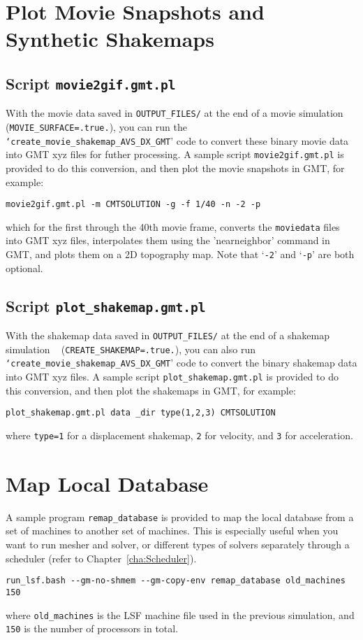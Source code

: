 \section{Plot Movie Snapshots and Synthetic Shakemaps}


\subsection{Script \texttt{movie2gif.gmt.pl}}

With the movie data saved in \texttt{OUTPUT\_FILES/} at the end of
a movie simulation (\texttt{\small MOVIE\_SURFACE=.true.}{\small ),
you can run the }\texttt{\small `create\_movie\_shakemap\_AVS\_DX\_GMT}{\small '
code to convert these binary movie data into GMT xyz files for futher
processing. A sample script }\texttt{\small movie2gif.gmt.pl}{\small{}
is provided to do this conversion, and then plot the movie snapshots
in GMT, for example:}{\small \par}
\begin{verbatim}
movie2gif.gmt.pl -m CMTSOLUTION -g -f 1/40 -n -2 -p
\end{verbatim}
which for the first through the 40th movie frame, converts the \texttt{moviedata}
files into GMT xyz files, interpolates them using the 'nearneighbor'
command in GMT, and plots them on a 2D topography map. Note that `\texttt{-2}'
and `\texttt{-p}' are both optional.


\subsection{Script \texttt{plot\_shakemap.gmt.pl}}

With the shakemap data saved in \texttt{OUTPUT\_FILES/} at the end
of a shakemap simulation ~\newline
 (\texttt{CREATE\_SHAKEMAP=.true.}), you can also run \texttt{`create\_movie\_shakemap\_AVS\_DX\_GMT}'
code to convert the binary shakemap data into GMT xyz files. A sample
script \texttt{plot\_shakemap.gmt.pl} is provided to do this conversion,
and then plot the shakemaps in GMT, for example:
\begin{verbatim}
plot_shakemap.gmt.pl data _dir type(1,2,3) CMTSOLUTION
\end{verbatim}
where \texttt{type=1} for a displacement shakemap, \texttt{2} for
velocity, and \texttt{3} for acceleration.


\section{Map Local Database}

A sample program \texttt{remap\_database} is provided to map the local
database from a set of machines to another set of machines. This is
especially useful when you want to run mesher and solver, or different
types of solvers separately through a scheduler (refer to Chapter~\ref{cha:Scheduler}).
\begin{verbatim}
run_lsf.bash --gm-no-shmem --gm-copy-env remap_database old_machines 150
\end{verbatim}
where \texttt{old\_machines} is the LSF machine file used in the previous
simulation, and \texttt{150} is the number of processors in total.


